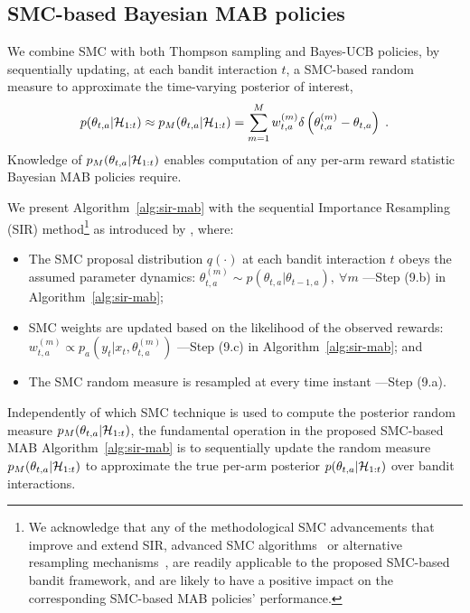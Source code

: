 \subsection{SMC-based Bayesian MAB policies}
\label{ssec:sir-policies}

We combine SMC with both Thompson sampling and Bayes-UCB policies, 
by sequentially updating, at each bandit interaction $t$,
a SMC-based random measure to approximate the time-varying posterior of interest,
\begin{equation}
p(\theta_{t,a}|\mathcal{H}_{1:t})\approx p_M(\theta_{t,a}|\mathcal{H}_{1:t})=\sum_{m=1}^M w_{t,a}^{(m)} \delta\left(\theta_{t,a}^{(m)}-\theta_{t,a}\right) \;.
\end{equation}
Knowledge of $p_M(\theta_{t,a}|\mathcal{H}_{1:t})$ enables computation
of any per-arm reward statistic Bayesian MAB policies require.

We present Algorithm~\ref{alg:sir-mab}
with the sequential Importance Resampling (SIR) method\footnote{
	We acknowledge that any of the methodological SMC advancements that improve and extend SIR,
	\eg advanced SMC algorithms~\citep{ip-Merwe2001, j-Andrieu2010}
	or alternative resampling mechanisms~\citep{j-Li2015},
	are readily applicable to the proposed SMC-based bandit framework,
	and are likely to have a positive impact on the corresponding SMC-based MAB policies' performance.
} 
as introduced by \citet{j-Gordon1993}, 
where:
\begin{itemize}
	\item The SMC proposal distribution $q(\cdot)$ at each bandit interaction $t$ obeys the assumed parameter dynamics:
		$\theta_{t,a}^{(m)} \sim p(\theta_{t,a}|\theta_{t-1,a}), \ \forall m$ ---Step (9.b) in Algorithm~\ref{alg:sir-mab};
	\item SMC weights are updated based on the likelihood of the observed rewards:
		$w_{t,a}^{(m)} \propto p_a(y_t|x_t,\theta_{t,a}^{(m)})$ ---Step (9.c) in Algorithm~\ref{alg:sir-mab}; and
	\item The SMC random measure is resampled at every time instant ---Step (9.a).
\end{itemize}

Independently of which SMC technique is used to compute the posterior random measure $p_M(\theta_{t,a}|\mathcal{H}_{1:t})$,
the fundamental operation in the proposed SMC-based MAB Algorithm~\ref{alg:sir-mab} 
is to sequentially update the random measure $p_M(\theta_{t,a}|\mathcal{H}_{1:t})$
to approximate the true per-arm posterior $p(\theta_{t,a}|\mathcal{H}_{1:t})$
over bandit interactions.

